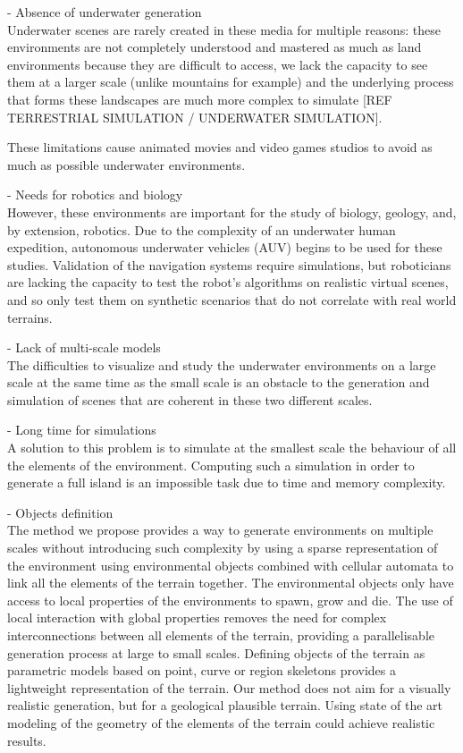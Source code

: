 \documentclass{egpubl}
\begin{document}
- Absence of underwater generation \\
Underwater scenes are rarely created in these media for multiple reasons: these environments are not completely understood and mastered as much as land environments because they are difficult to access, we lack the capacity to see them at a larger scale (unlike mountains for example) and the underlying process that forms these landscapes are much more complex to simulate [REF TERRESTRIAL SIMULATION / UNDERWATER SIMULATION].

These limitations cause animated movies and video games studios to avoid as much as possible underwater environments. 

- Needs for robotics and biology \\
However, these environments are important for the study of biology, geology, and, by extension, robotics. Due to the complexity of an underwater human expedition, autonomous underwater vehicles (AUV) begins to be used for these studies. Validation of the navigation systems require simulations, but roboticians are lacking the capacity to test the robot's algorithms on realistic virtual scenes, and so only test them on synthetic scenarios that do not correlate with real world terrains.

- Lack of multi-scale models \\
The difficulties to visualize and study the underwater environments on a large scale at the same time as the small scale is an obstacle to the generation and simulation of scenes that are coherent in these two different scales.

- Long time for simulations \\
A solution to this problem is to simulate at the smallest scale the behaviour of all the elements of the environment. Computing such a simulation in order to generate a full island is an impossible task due to time and memory complexity. 

- Objects definition \\
The method we propose provides a way to generate environments on multiple scales without introducing such complexity by using a sparse representation of the environment using environmental objects combined with cellular automata to link all the elements of the terrain together.
The environmental objects only have access to local properties of the environments to spawn, grow and die. The use of local interaction with global properties removes the need for complex interconnections between all elements of the terrain, providing a parallelisable generation process at large to small scales.
Defining objects of the terrain as parametric models based on point, curve or region skeletons provides a lightweight representation of the terrain.
Our method does not aim for a visually realistic generation, but for a geological plausible terrain. Using state of the art modeling of the geometry of the elements of the terrain could achieve realistic results.
\end{document}
